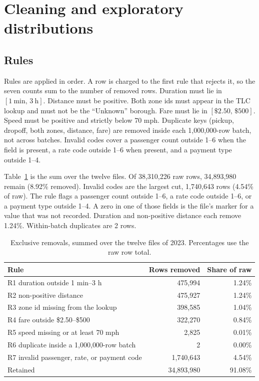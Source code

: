 \documentclass[11pt,a4paper]{article}
\begin{document}
\section{Cleaning and exploratory distributions}
\label{sec:eda}

\subsection{Rules}
Rules are applied in order. A row is charged to the first rule that rejects it, so the seven counts sum to the number of removed rows. Duration must lie in $[1~\mathrm{min},\,3~\mathrm{h}]$. Distance must be positive. Both zone ids must appear in the TLC lookup and must not be the ``Unknown'' borough. Fare must lie in $[\$2.50,\,\$500]$. Speed must be positive and strictly below 70 mph. Duplicate keys (pickup, dropoff, both zones, distance, fare) are removed inside each 1{,}000{,}000-row batch, not across batches. Invalid codes cover a passenger count outside 1--6 when the field is present, a rate code outside 1--6 when present, and a payment type outside 1--4.

Table~\ref{tab:rules} is the sum over the twelve files. Of 38,310,226 raw rows, 34,893,980 remain (8.92\% removed). Invalid codes are the largest cut, 1,740,643 rows (4.54\% of raw). The rule flags a passenger count outside 1--6, a rate code outside 1--6, or a payment type outside 1--4. A zero in one of those fields is the file's marker for a value that was not recorded. Duration and non-positive distance each remove 1.24\%. Within-batch duplicates are 2 rows.

\begin{table}[ht]
\centering
\caption{Exclusive removals, summed over the twelve files of 2023. Percentages use the raw row total.}
\label{tab:rules}
\begin{tabular}{lrr}
\toprule
Rule & Rows removed & Share of raw \\
\midrule
R1 duration outside 1 min--3 h & 475,994 & 1.24\% \\
R2 non-positive distance & 475,927 & 1.24\% \\
R3 zone id missing from the lookup & 398,585 & 1.04\% \\
R4 fare outside \$2.50--\$500 & 322,270 & 0.84\% \\
R5 speed missing or at least 70 mph & 2,825 & 0.01\% \\
R6 duplicate inside a 1{,}000{,}000-row batch & 2 & 0.00\% \\
R7 invalid passenger, rate, or payment code & 1,740,643 & 4.54\% \\
\midrule
Retained & 34,893,980 & 91.08\% \\
\bottomrule
\end{tabular}
\end{table}
\end{document}
